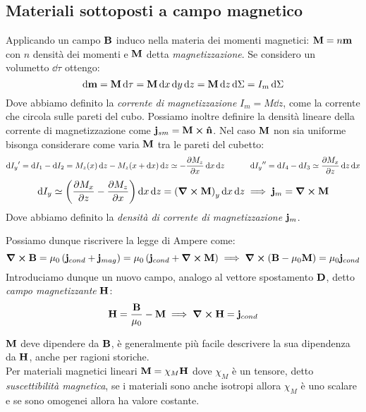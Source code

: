 \documentclass[12pt,a4paper]{article}
\begin{document}
\subsection{Materiali sottoposti a campo magnetico}
Applicando un campo $\vb{B}$ induco nella materia dei momenti magnetici: $\vb{M} = n\vb{m}$ con $n$ densità dei momenti e $\vb{M}$ detta \textit{magnetizzazione}.
Se considero un volumetto $\dd{\tau}$ ottengo:
\begin{equation*}
    \dd{\vb{m}}= \vb{M}\dd{\tau} = \vb{M}\dd{x}\dd{y}\dd{z}= \vb{M}\dd{z}\dd{\Sigma}= I_m\dd{\Sigma}
\end{equation*}
Dove abbiamo definito la \textit{corrente di magnetizzazione} $I_m= M\dd{z}$, come la corrente che circola sulle pareti del cubo. 
Possiamo inoltre definire la densità lineare della 
corrente di magnetizzazione come $\vb{j}_{sm}= \vb{M}\cp\vu{n}$.
Nel caso $\vb{M}$ non sia uniforme bisonga considerare come varia $\vb{M}$ tra le pareti del cubetto:
\begin{equation*}
    \dd{I_y}'= \dd{I_1}-\dd{I_2}= M_z(x)\dd{z}-M_z(x+\dd{x})\dd{z}\simeq-\pdv{M_z}{x}\dd{x}\dd{z}\qquad \quad 
    \dd{I_y}'' = \dd{I_4}-\dd{I_3}\simeq \pdv{M_x}{z}\dd{z}\dd{x}
\end{equation*}
\begin{equation*}
    \dd{I_y}\simeq \left( \pdv{M_x}{z}-\pdv{M_z}{x} \right)\dd{x}\dd{z}= \left( \curl{\vb{M}} \right)_y \dd{x}\dd{z}
    \implies \vb{j}_m = \curl{\vb{M}}
\end{equation*}
Dove abbiamo definito la \textit{densità di corrente di magnetizzazione} $\vb{j}_m$.

Possiamo dunque riscrivere la legge di Ampere come:
\begin{equation*}
    \curl{\vb{B}}= \mu_0\left( \vb{j}_{cond} +\vb{j}_{mag} \right)= \mu_0\left( \vb{j}_{cond} +\curl{\vb{M}} \right)
    \implies \curl(\vb{B}-\mu_0\vb{M})= \mu_0\vb{j}_{cond}
\end{equation*}
Introduciamo dunque un nuovo campo, analogo al vettore spostamento $\vb{D}$, detto \textit{campo magnetizzante} $\vb{H}$:
\begin{equation*}
    \vb{H}= \frac{\vb{B}}{\mu_0}-\vb{M}\implies \curl{\vb{H}}= \vb{j}_{cond}
\end{equation*}

$\vb{M}$ deve dipendere da $\vb{B}$, è generalmente più facile descrivere la sua dipendenza da $\vb{H}$, anche per ragioni storiche.
\\ Per materiali magnetici lineari $\vb{M}= \chi_M\vb{H}$ dove $\chi_M$ è un tensore, detto \textit{suscettibilità magnetica}, 
se i materiali sono anche isotropi allora $\chi_M$ è uno scalare e se sono omogenei allora ha valore costante.
\end{document}
